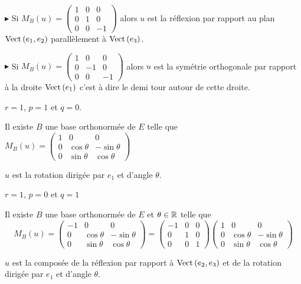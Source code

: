 $\blacktriangleright$ Si $M_B(u) = \begin{pmatrix}
    1 & 0 & 0 \\
    0 & 1 & 0 \\
    0 & 0 & -1
\end{pmatrix}$ alors $u$ est la réflexion par rapport au plan $\operatorname{Vect} \,(e_1, e_2)$ parallèlement à $\operatorname{Vect} \,(e_3)$.

\avspace $\blacktriangleright$ Si $M_B(u) = \begin{pmatrix}
    1 & 0 & 0 \\
    0 & -1 & 0 \\
    0 & 0 & -1
    \end{pmatrix}$ alors $u$ est la symétrie orthogonale par rapport à la droite 
    $\operatorname{Vect} \,(e_1)$ c'est à dire le demi tour autour de cette droite. 

 $r = 1$, $p = 1$ et $q = 0$.

\svspace Il existe $B$ une base orthonormée de $E$ telle que $M_B(u) = \begin{pmatrix}
    1 & 0 & 0 \\
    0 & \cos \theta & -\sin \theta \\
    0 & \sin \theta & \cos \theta
\end{pmatrix}$

$u$ est la rotation dirigée par $e_1$ et d'angle $\theta$. 

 $r = 1$, $p = 0$ et $q = 1$

\svspace Il existe $B$ une base orthonormée de $E$ et $\theta \in \mathbb{R}$ telle que 
$$M_B(u) = \begin{pmatrix}
    -1 & 0 & 0 \\
    0 & \cos \theta & -\sin \theta \\
    0 & \sin \theta & \cos \theta
\end{pmatrix} = \begin{pmatrix}
    -1 & 0 & 0 \\
    0 & 1 & 0 \\
    0 & 0 & 1
\end{pmatrix} \begin{pmatrix}
    1 & 0 & 0 \\
    0 & \cos \theta & -\sin \theta \\
    0 & \sin \theta & \cos \theta
\end{pmatrix}$$

$u$ est la composée de la réflexion par rapport à $\operatorname{Vect} \,(e_2, e_3)$ et de la rotation
dirigée par $e_1$ et d'angle $\theta$.


